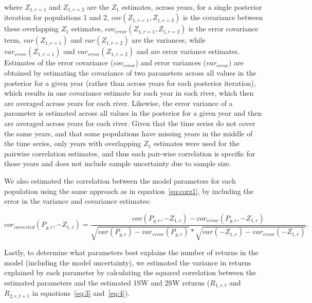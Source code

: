 \documentclass[12pt]{article}
\begin{document}

where $Z_{1,r=1}$ and $Z_{1,r=2}$ are the $Z_1$ estimates, across years, for a
single posterior iteration for populations 1 and 2,
$cov(Z_{1,r=1}, Z_{1,r=2})$ is the covariance between these overlapping $Z_1$ estimates,
$cov_{error}(Z_{1,r=1}, Z_{1,r=2})$ is the error covariance term,
$var(Z_{1,r=1})$ and $var(Z_{1,r=2})$ are the variances, while
$var_{error}(Z_{1,r=1})$ and $var_{error}(Z_{1,r=2})$ and are error variance estimates.
Estimates of the error covariance ($cov_{error}$) and error
variances ($var_{error}$) are obtained by estimating the covariance of
two parameters across all values in the posterior for a given year (rather
than across years for each posterior iteration), which results in one
covariance estimate for each year in each river, which then are averaged
across years for each river. Likewise, the error variance of a parameter is estimated
across all values in the posterior for a given year and then are averaged
across years for each river.
Given that the time series do not cover the same years, and that some populations
have missing years in the middle of the time series, only years with overlapping
$Z_1$ estimates were used for the pairwise correlation estimates, and thus
each pair-wise correlation is specific for those years and does not include sample uncertainty due to sample size.

We also estimated the correlation between the model parameters for each population using
the same approach as in equation~\ref{eq:corz1},
by including the error in the variance and covariance estimates:

\begin{equation}
cor_{corrected}(P_{g,r},-Z_{1,r}) = \frac{cov(P_{g,r}, -Z_{1,r}) - cov_{error}(P_{g,r}, -Z_{1,r})}
{\sqrt{var(P_{g,r})- var_{error}(P_{g,r})}*\sqrt{var(-Z_{1,r}) - var_{error}(-Z_{1,r})}}\label{eq:corparam}.
\end{equation}

Lastly, to determine what parameters best explains the number of returns in
the model (including the model uncertainty), we estimated the variance in returns explained by each parameter by
calculating the squared correlation between the estimated parameters and the
estimated 1SW and 2SW returns ($R_{1,r,t}$ and $R_{2,r,t+1}$ in
equations~\ref{eq:3} and~\ref{eq:4}).
\end{document}

